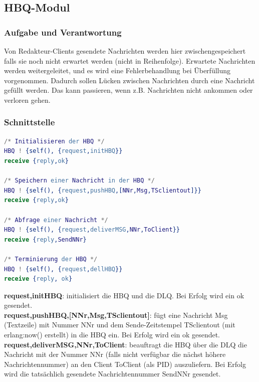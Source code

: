 \documentclass{article}
\begin{document}
\newpage
			
\subsection{HBQ-Modul}
\subsubsection{Aufgabe und Verantwortung}

Von Redakteur-Clients gesendete Nachrichten werden hier zwischengespeichert falls sie noch nicht
erwartet werden (nicht in Reihenfolge). Erwartete Nachrichten werden weitergeleitet, und es wird eine Fehlerbehandlung
bei Überfüllung vorgenommen. Dadurch sollen Lücken zwischen Nachrichten durch eine Nachricht gefüllt werden. Das kann
passieren, wenn z.B. Nachrichten nicht ankommen oder verloren gehen.

\subsubsection{Schnittstelle}
\begin{lstlisting}[language=Erlang]
/* Initialisieren der HBQ */
HBQ ! {self(), {request,initHBQ}}
receive {reply,ok}

/* Speichern einer Nachricht in der HBQ */
HBQ ! {self(), {request,pushHBQ,[NNr,Msg,TSclientout]}}
receive {reply,ok}

/* Abfrage einer Nachricht */
HBQ ! {self(), {request,deliverMSG,NNr,ToClient}}
receive {reply,SendNNr}

/* Terminierung der HBQ */
HBQ ! {self(), {request,dellHBQ}}
receive {reply, ok}
\end{lstlisting}

\textbf{{request,initHBQ}}: initialisiert die HBQ und die DLQ. Bei Erfolg wird ein ok gesendet.\\

\textbf{{request,pushHBQ,[NNr,Msg,TSclientout]}}: fügt eine Nachricht Msg (Textzeile) mit Nummer NNr und dem
Sende-Zeitstempel TSclientout (mit erlang:now() erstellt) in die HBQ ein. Bei Erfolg wird ein ok gesendet.\\

\textbf{{request,deliverMSG,NNr,ToClient}}: beauftragt die HBQ über die DLQ die Nachricht mit der Nummer NNr
(falls nicht verfügbar die nächst höhere Nachrichtennummer) an den Client ToClient (als PID) auszuliefern. Bei Erfolg
wird die tatsächlich gesendete Nachrichtennummer SendNNr gesendet.\\
\end{document}
